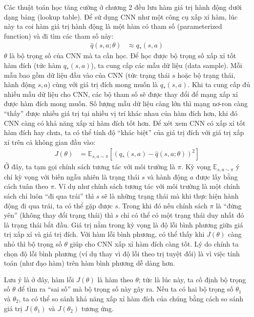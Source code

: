 	Các thuật toán học tăng cường ở chương 2 đều lưu hàm giá trị hành động dưới dạng bảng (lookup table).
	Để sử dụng CNN như một công cụ xấp xỉ hàm, lúc này ta coi hàm giá trị hành động là một hàm có tham số (parameterized function) và đi tìm các tham số này:
	\begin{align}
		\hat{q}(s,a;\theta) &\approx q_{*}(s,a) \label{eq_DefQhat}
	\end{align}
	$\theta$ là bộ trọng số của CNN mà ta cần học.
	Để học được bộ trọng số xấp xỉ tốt hàm đích (tức hàm $q_{*}(s,a)$), ta cung cấp các mẫu dữ liệu (data sample).
	Mỗi mẫu bao gồm dữ liệu đầu vào của CNN (tức trạng thái $s$ hoặc bộ trạng thái, hành động $s, a$) cùng với giá trị đích mong muốn là $q_{*}(s,a)$.
	Khi ta cung cấp đủ nhiều mẫu dữ liệu cho CNN, các bộ tham số sẽ được thay đổi để mạng xấp xỉ được hàm đích mong muốn.
	Số lượng mẫu dữ liệu càng lớn thì mạng nơ-ron càng ``thấy'' được nhiều giá trị tại nhiều vị trí khác nhau của hàm đích hơn, khi đó CNN càng có khả năng xấp xỉ hàm đích tốt hơn.	
	Để xét xem CNN có xấp xỉ tốt hàm đích hay chưa, ta có thể tính độ ``khác biệt'' của giá trị đích với giá trị xấp xỉ trên cả không gian đầu vào:
	\begin{align}
		\label{eq_ExpectedErrorQ}
		J(\theta) &= \mathbb{E}_{s,a \sim \pi}[(q_{*}(s,a) - \hat{q}(s,a;\theta))^2]
	\end{align}
	Ở đây, ta tạm gọi chính sách tương tác với môi trường là $\pi$.
	Kỳ vọng $\mathbb{E}_{s,a \sim \pi}$ ý chỉ kỳ vọng với biến ngẫu nhiên là trạng thái $s$ và hành động $a$ được lấy bằng cách tuân theo $\pi$.
	Ví dụ như chính sách tương tác với môi trường là một chính sách chỉ luôn ``đi qua trái'' thì $s$ sẽ là những trạng thái mà khi thực hiện hành động đi qua trái, ta có thể gặp được $s$.
	Trong khi đó nếu chính sách $\pi$ là ``đứng yên'' (không thay đổi trạng thái) thì $s$ chỉ có thể có một trạng thái duy nhất đó là trạng thái bắt đầu.
	Giá trị nằm trong kỳ vọng là độ lỗi bình phương giữa giá trị xấp xỉ và giá trị đích.
	Với hàm lỗi bình phương, có thể thấy khi $J(\theta)$ càng nhỏ thì bộ trọng số $\theta$ giúp cho CNN xấp xỉ hàm đích càng tốt.
	Lý do chính ta chọn độ lỗi bình phương (ví dụ thay vì độ lỗi theo trị tuyệt đối) là vì việc tính toán (như đạo hàm) trên hàm bình phương dễ dàng hơn.
	
	Lưu ý là ở đây, hàm lỗi $J(\theta)$ là hàm theo $\theta$; tức là lúc này, ta cố định bộ trọng số $\theta$ để tìm ra ``sai số'' mà bộ trọng số này gây ra.
	Nếu ta có hai bộ trọng số $\theta_1$ và $\theta_2$, ta có thể so sánh khả năng xấp xỉ hàm đích của chúng bằng cách so sánh giá trị $J(\theta_1)$ và $J(\theta_2)$ tương ứng.
	
